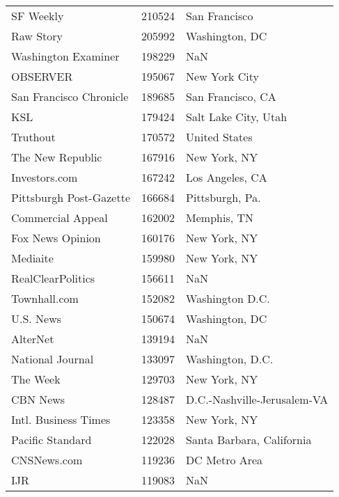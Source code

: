 \begin{longtable}{lrl}
	SF Weekly &     210524 &                         San Francisco \\
	Raw Story &     205992 &                        Washington, DC \\
	Washington Examiner &     198229 &                                   NaN \\
	OBSERVER &     195067 &                         New York City \\
	San Francisco Chronicle &     189685 &                     San Francisco, CA \\
	KSL &     179424 &                  Salt Lake City, Utah \\
	Truthout &     170572 &                         United States \\
	The New Republic &     167916 &                          New York, NY \\
	Investors.com &     167242 &                       Los Angeles, CA \\
	Pittsburgh Post-Gazette &     166684 &                       Pittsburgh, Pa. \\
	Commercial Appeal &     162002 &                           Memphis, TN \\
	Fox News Opinion &     160176 &                          New York, NY \\
	Mediaite &     159980 &                          New York, NY \\
	RealClearPolitics &     156611 &                                   NaN \\
	Townhall.com &     152082 &                       Washington D.C. \\
	U.S. News &     150674 &                        Washington, DC \\
	AlterNet &     139194 &                                   NaN \\
	National Journal &     133097 &                      Washington, D.C. \\
	The Week &     129703 &                          New York, NY \\
	CBN News &     128487 &           D.C.-Nashville-Jerusalem-VA \\
	Intl. Business Times &     123358 &                          New York, NY \\
	Pacific Standard &     122028 &             Santa Barbara, California \\
	CNSNews.com &     119236 &                         DC Metro Area \\
	IJR &     119083 &                                   NaN \\

\end{longtable}
